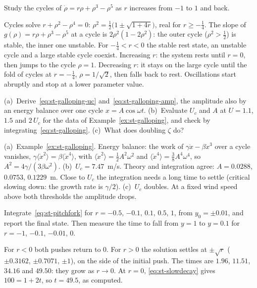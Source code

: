 \label{exo:st-subhopf}
%
Study the cycles of $\dot\rho = r\rho + \rho^3 - \rho^5$ as $r$ increases from $-1$ to
$1$ and back.
\begin{solution}
Cycles solve $r + \rho^2 - \rho^4 = 0$: $\rho^2 = \tfrac12\bigl(1 \pm \sqrt{1 + 4r}\bigr)$,
real for $r \ge -\tfrac14$. The slope of $g(\rho) = r\rho + \rho^3 - \rho^5$ at a cycle is
$2\rho^2(1 - 2\rho^2)$: the outer cycle ($\rho^2 > \tfrac12$) is stable, the inner one
unstable. For $-\tfrac14 < r < 0$ the stable rest state, an unstable cycle and a large
stable cycle coexist. Increasing $r$: the system rests until $r = 0$, then jumps to the
cycle $\rho = 1$. Decreasing $r$: it stays on the large cycle until the fold of cycles
at $r = -\tfrac14$, $\rho = 1/\sqrt2$, then falls back to rest. Oscillations start
abruptly and stop at a lower parameter value.
\end{solution}

\label{exo:st-galloping}
%
(a)~Derive~\eqref{eq:st-galloping-uc} and~\eqref{eq:st-galloping-amp}, the amplitude
also by an energy balance over one cycle $x = A\cos\omega t$. (b)~Evaluate $U_c$ and
$A$ at $U = 1.1$, $1.5$ and $2\,U_c$ for the data of Example~\ref{ex:st-galloping}, and
check by integrating~\eqref{eq:st-galloping}. (c)~What does doubling $\zeta$ do?
\begin{solution}
(a)~Example~\ref{ex:st-galloping}. Energy balance: the work of
$\gamma\dot x - \beta\dot x^3$ over a cycle vanishes, $\gamma\langle\dot x^2\rangle
= \beta\langle\dot x^4\rangle$, with $\langle\dot x^2\rangle = \tfrac12A^2\omega^2$ and
$\langle\dot x^4\rangle = \tfrac38A^4\omega^4$, so $A^2 = 4\gamma/(3\beta\omega^2)$.
(b)~$U_c = 7.47$~m/s. Theory and integration agree: $A = 0.0288$, $0.0753$,
$0.1229$~m. Close to $U_c$ the integration needs a long time to settle (critical
slowing down: the growth rate is $\gamma/2$).
(c)~$U_c$ doubles. At a fixed wind speed above both thresholds the amplitude drops.

\end{solution}

\label{exo:st-computer-pitchfork}
%
Integrate~\eqref{eq:st-pitchfork} for $r = -0.5$, $-0.1$, $0.1$, $0.5$, $1$, from
$y_0 = \pm 0.01$, and report the final state. Then measure the time to fall from
$y = 1$ to $y = 0.1$ for $r = -1$, $-0.1$, $-0.01$, $0$.
\begin{solution}
For $r < 0$ both pushes return to $0$. For $r > 0$ the solution settles at
$\pm\sqrt r$ ($\pm 0.3162$, $\pm 0.7071$, $\pm 1$), on the side of the initial
push. The times are $1.96$, $11.51$, $34.16$ and $49.50$: they grow as $r \to 0$.
At $r = 0$, \eqref{eq:st-slowdecay} gives $100 = 1 + 2t$, so $t = 49.5$, as computed.

\end{solution}

